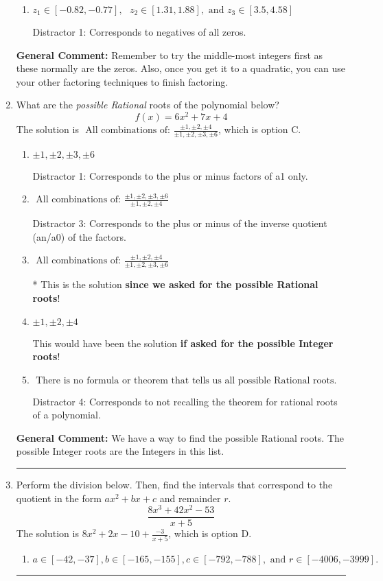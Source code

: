 \documentclass{extbook}[14pt]
\newcommand{\litem}[1]{\item #1

\rule{\textwidth}{0.4pt}}
\begin{document}
\begin{enumerate}
{\begin{enumerate}[label=\Alph*.]
* This is the solution!
\item \( z_1 \in [-0.82, -0.77], \text{   }  z_2 \in [1.31, 1.88], \text{   and   } z_3 \in [3.5, 4.58] \)

 Distractor 1: Corresponds to negatives of all zeros.
\end{enumerate}

\textbf{General Comment:} Remember to try the middle-most integers first as these normally are the zeros. Also, once you get it to a quadratic, you can use your other factoring techniques to finish factoring.
}
\litem{
What are the \textit{possible Rational} roots of the polynomial below?
\[ f(x) = 6x^{2} +7 x + 4 \]The solution is \( \text{ All combinations of: }\frac{\pm 1,\pm 2,\pm 4}{\pm 1,\pm 2,\pm 3,\pm 6} \), which is option C.\begin{enumerate}[label=\Alph*.]
\item \( \pm 1,\pm 2,\pm 3,\pm 6 \)

 Distractor 1: Corresponds to the plus or minus factors of a1 only.
\item \( \text{ All combinations of: }\frac{\pm 1,\pm 2,\pm 3,\pm 6}{\pm 1,\pm 2,\pm 4} \)

 Distractor 3: Corresponds to the plus or minus of the inverse quotient (an/a0) of the factors. 
\item \( \text{ All combinations of: }\frac{\pm 1,\pm 2,\pm 4}{\pm 1,\pm 2,\pm 3,\pm 6} \)

* This is the solution \textbf{since we asked for the possible Rational roots}!
\item \( \pm 1,\pm 2,\pm 4 \)

This would have been the solution \textbf{if asked for the possible Integer roots}!
\item \( \text{ There is no formula or theorem that tells us all possible Rational roots.} \)

 Distractor 4: Corresponds to not recalling the theorem for rational roots of a polynomial.
\end{enumerate}

\textbf{General Comment:} We have a way to find the possible Rational roots. The possible Integer roots are the Integers in this list.
}
\litem{
Perform the division below. Then, find the intervals that correspond to the quotient in the form $ax^2+bx+c$ and remainder $r$.
\[ \frac{8x^{3} +42 x^{2} -53}{x + 5} \]The solution is \( 8x^{2} +2 x -10 + \frac{-3}{x + 5} \), which is option D.\begin{enumerate}[label=\Alph*.]
\item \( a \in [-42, -37], b \in [-165, -155], c \in [-792, -788], \text{ and } r \in [-4006, -3999]. \)


\end{enumerate}}
\end{enumerate}
\end{document}
